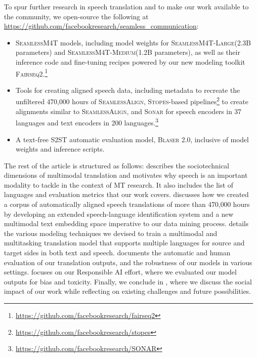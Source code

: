 \documentclass[twoside,11pt]{article}
\newcommand{\mineddata}{\textsc{SeamlessAlign}\xspace}
\newcommand{\mfourt}{\textsc{SeamlessM4T}\xspace}
\newcommand{\mfourtlg}{\textsc{SeamlessM4T-Large}\xspace}
\newcommand{\mfourtmd}{\textsc{SeamlessM4T-Medium}\xspace}
\newcommand{\blaser}{\textsc{Blaser 2.0}\xspace}
\newcommand{\sonar}{\textsc{Sonar}\xspace}
\newcommand{\stopes}{\textsc{Stopes}\xspace} %
\newcommand{\fairseq}{\textsc{Fairseq2}\xspace} %
\newcommand{\totalminedhours}{470,000\xspace}
\begin{document}
To spur further research in speech translation and to make our work available to the community, we open-source the following at \url{https://github.com/facebookresearch/seamless_communication}:
\begin{itemize}
\item \mfourt models, including model weights for \mfourtlg (2.3B parameters) and \mfourtmd (1.2B parameters), as well as their inference code and fine-tuning recipes powered by our new modeling toolkit \fairseq.\footnote{\url{https://github.com/facebookresearch/fairseq2}}

\item Tools for creating aligned speech data, including metadata to recreate the unfiltered \totalminedhours hours of \mineddata,  \stopes-based pipelines\footnote{\url{https://github.com/facebookresearch/stopes}} to create alignments similar to \mineddata, and \sonar for speech encoders in 37 languages and text encoders in 200 languages.\footnote{\url{https://github.com/facebookresearch/SONAR}}

\item A text-free S2ST automatic evaluation model, \blaser, inclusive of model weights and inference scripts.
\end{itemize}

The rest of the article is structured as follows:  describes the sociotechnical dimensions of multimodal translation and motivates why speech is an important modality to tackle in the context of MT research. 
It also includes the list of languages and evaluation metrics that our work covers. 
 discusses how we created a corpus of automatically aligned speech translations of more than \totalminedhours hours by developing an extended speech-language identification system and a new multimodal text embedding space imperative to our data mining process. 
 details the various modeling techniques we devised to train a multimodal and multitasking translation model that supports multiple languages for source and target sides in both text and speech.
 documents the automatic and human evaluation of our translation outputs, and the robustness of our models in various settings. 
 focuses on our Responsible AI effort, where we evaluated our model outputs for bias and toxicity. Finally, we conclude in , where we discuss the social impact of our work while reflecting on existing challenges and future possibilities. 















%

\newpage
\begin{appendices}




\end{appendices}
\end{document}
